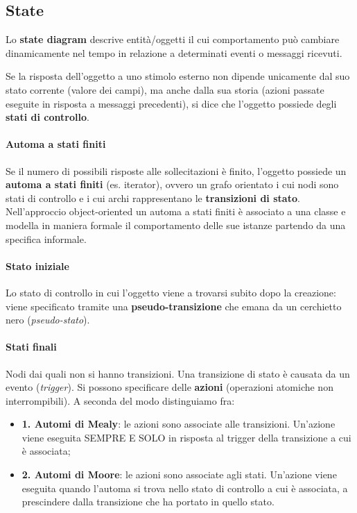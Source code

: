 \subsection{State}

Lo \textbf{state diagram} descrive entità/oggetti il cui comportamento può cambiare dinamicamente nel tempo in relazione a determinati eventi o messaggi ricevuti.

Se la risposta dell'oggetto a uno stimolo esterno non dipende unicamente dal suo stato corrente (valore dei campi), ma anche dalla sua storia (azioni passate eseguite in risposta a messaggi precedenti), si dice che l'oggetto possiede degli \textbf{stati di controllo}.

\paragraph{Automa a stati finiti} Se il numero di possibili risposte alle sollecitazioni è finito, l'oggetto possiede un \textbf{automa a stati finiti} (es. iterator), ovvero un grafo orientato i cui nodi sono stati di controllo e i cui archi rappresentano le \textbf{transizioni di stato}.
Nell'approccio object-oriented un automa a stati finiti è associato a una classe e modella in maniera formale il comportamento delle sue istanze partendo da una specifica informale.

\paragraph{Stato iniziale} Lo stato di controllo in cui l'oggetto viene a trovarsi subito dopo la creazione: viene specificato tramite una \textbf{pseudo-transizione} che emana da un cerchietto nero (\textit{pseudo-stato}).

\paragraph{Stati finali} Nodi dai quali non si hanno transizioni. Una transizione di stato è causata da un evento (\textit{trigger}). Si possono specificare delle \textbf{azioni} (operazioni atomiche non interrompibili). A seconda del modo distinguiamo fra:
\begin{itemize}
    \item \textbf{1. Automi di Mealy}: le azioni sono associate alle transizioni. Un'azione viene eseguita SEMPRE E SOLO in risposta al trigger della transizione a cui è associata;
    \item \textbf{2. Automi di Moore}: le azioni sono associate agli stati. Un'azione viene eseguita quando l'automa si trova nello stato di controllo a cui è associata, a prescindere dalla transizione che ha portato in quello stato.
\end{itemize}


